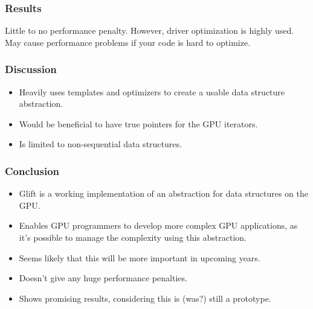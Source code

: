 \documentclass[xcolor={usenames,dvipsnames}]{beamer}
\begin{document}
\begin{frame}
  \frametitle{Results}

  Little to no performance penalty. \pause However, driver optimization is highly
  used. May cause performance problems if your code is hard to optimize.
\end{frame}

\begin{frame}
  \frametitle{Discussion}

  \begin{itemize}
  \item<1-> Heavily uses templates and optimizers to create a usable data
    structure abstraction.
  \item<2-> Would be beneficial to have true pointers for the GPU iterators.
  \item<3-> Is limited to non-sequential data structures.
  \end{itemize}
\end{frame}

\begin{frame}
  \frametitle{Conclusion}

  \begin{itemize}
  \item<+-> Glift is a working implementation of an abstraction for data
    structures on the GPU.
  \item<+-> Enables GPU programmers to develop more complex GPU applications, as
    it's possible to manage the complexity using this abstraction.
  \item<+-> Seems likely that this will be more important in upcoming years.
  \item<+-> Doesn't give any huge performance penalties.
  \item<+-> Shows promising results, considering this is (was?) still a
    prototype.
  \end{itemize}
\end{frame}
\end{document}
